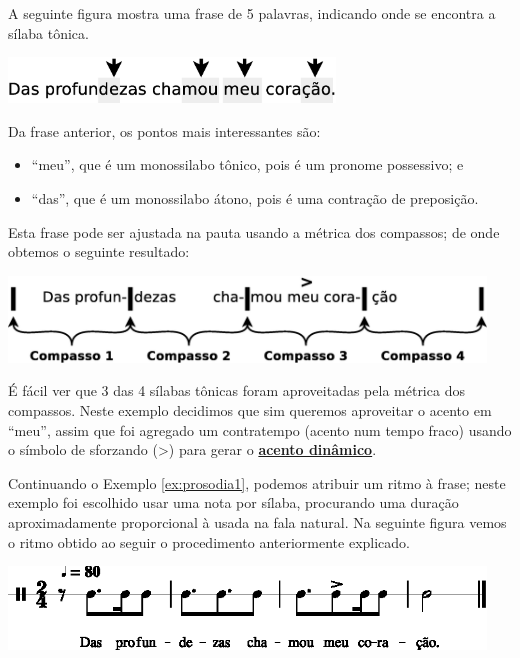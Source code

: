 
\begin{example}
\label{ex:prosodia1}
A seguinte figura mostra uma frase de 5 palavras, indicando onde se encontra a sílaba tônica.
\begin{center}
\includegraphics[width=0.65\textwidth]{chapters/cap-musica-topicos/prosodia1.eps}
\end{center}
Da frase anterior, os pontos mais interessantes são:
\begin{itemize}
\item ``meu'', que é um monossilabo tônico, pois é um pronome possessivo; e
\item ``das'', que é um monossilabo átono, pois é uma contração de preposição.
\end{itemize}
Esta frase pode ser ajustada na pauta usando a métrica dos compassos;
de onde obtemos o seguinte resultado:
\begin{center}
\includegraphics[width=0.95\textwidth]{chapters/cap-musica-topicos/prosodia2.eps}
\end{center}
É fácil ver que 3 das 4 sílabas tônicas foram aproveitadas pela métrica dos compassos.
Neste exemplo decidimos que sim queremos aproveitar o acento em ``meu'', 
assim que foi agregado um contratempo (acento num tempo fraco) usando o símbolo de sforzando (>)
para gerar o \hyperref[def:acentodinamico]{\textbf{acento dinâmico}}. 
\end{example}

\begin{example}
\label{ex:prosodia2}
Continuando o Exemplo \ref{ex:prosodia1}, podemos atribuir um ritmo à frase; 
neste exemplo foi escolhido usar uma nota por sílaba, 
procurando uma duração aproximadamente proporcional à usada na fala natural.
Na seguinte figura vemos o ritmo obtido ao seguir o procedimento anteriormente explicado. 
\begin{center}
\includegraphics[width=0.95\textwidth]{chapters/cap-musica-topicos/frase5a-1.eps}
\end{center}
\end{example}

